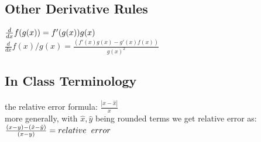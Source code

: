 \subsection*{Other Derivative Rules}
$\frac{d}{dx} f(g(x)) = f'(g(x))g(x) \hspace{1mm}$\\
$\frac{d}{dx} f(x)/g(x) = \frac{(f'(x)g(x) - g'(x)f(x))}{g(x)^2}$\\


\subsection*{In Class Terminology}
the relative error formula:
$ \frac{|x - \hat{x}|}{x} $\\
more generally, with $\hat{x},\hat{y}$ being rounded terms we get relative error as:\\
$\frac{(x-y) - (\hat{x}-\hat{y})}{(x-y)} = relative \hspace{2mm} error$\\
\vspace{300mm}
